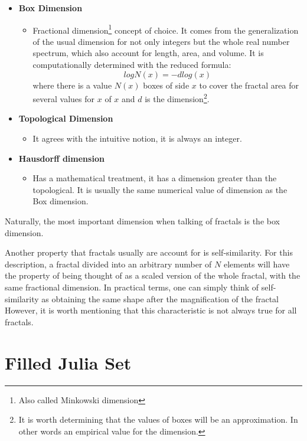 \documentclass{article}
\begin{document}
\begin{itemize}
    \item \textbf{Box Dimension}
    \begin{itemize}
        \item Fractional dimension\footnote{Also called Minkowski dimension} concept of choice. It comes from the generalization of the usual dimension for not only integers but the whole real number spectrum, which also account for length, area, and volume. It is computationally determined with the reduced formula:
        \begin{equation}
            log N(x)=- dlog(x)
        \end{equation}
         where there is a value $N(x)$ boxes of side $x$ to cover the fractal area for several values for $x$ of $x$ and $d$ is the dimension\footnote{It is worth determining that the values of boxes will be an approximation. In other words an empirical value for the dimension.}.
    \end{itemize}
   
    \item \textbf{Topological Dimension}
    \begin{itemize}
        \item It agrees with the intuitive notion, it is always an integer. 
    \end{itemize}
    \item \textbf{Hausdorff dimension}
    \begin{itemize}
        \item Has a mathematical treatment, it has a dimension greater than the topological. It is usually the same numerical value of dimension as the Box dimension.
    \end{itemize}
\end{itemize}

Naturally, the most important dimension when talking of fractals is the box dimension.

Another property that fractals usually are account for is self-similarity. For this description, a fractal divided into an arbitrary number of $N$ elements will have the property of being thought of as a scaled version of the whole fractal, with the same fractional dimension\cite{Crownover}. In practical terms, one can simply think of self-similarity as obtaining the same shape after the magnification of the fractal However, it is worth mentioning that this characteristic is not always true for all fractals.


\newpage
\section{Filled Julia Set}
\end{document}
